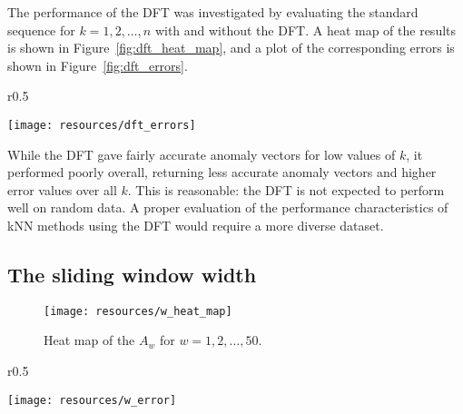 The performance of the DFT was investigated by evaluating the standard sequence for $k = 1,2,\dots, n$ with and without the DFT\@. A heat map of the results is shown in Figure~\ref{fig:dft_heat_map}, and a plot of the corresponding errors is shown in Figure~\ref{fig:dft_errors}.

\begin{wrapfigure}{r}{0.5\textwidth}
    \vspace{-30pt}
    \begin{center}
        \texttt{[image: resources/dft\_errors]}
    \end{center}
    \vspace{-20pt}
    \caption{\small{Errors of the $A_{k, t}$.}}
    \vspace{-10pt}
\label{fig:dft_errors}
\end{wrapfigure}

While the DFT gave fairly accurate anomaly vectors for low values of $k$, it performed poorly overall, returning less accurate anomaly vectors and higher error values over all $k$. This is reasonable: the DFT is not expected to perform well on random data. A proper evaluation of the performance characteristics of kNN methods using the DFT would require a more diverse dataset.

\clearpage

\subsection{The sliding window width}
\FloatBarrier{}
\label{sect:w}

\begin{figure}[h]
    \vspace{-15pt}
    \begin{center}
        \texttt{[image: resources/w\_heat\_map]}
    \end{center}
    \vspace{-20pt}
    \caption{\small{Heat map of the $A_w$ for $w = 1, 2, \dots, 50$.}}
    \vspace{-10pt}
\label{fig:w_heat_map}
\end{figure}

\begin{wrapfigure}{r}{0.5\textwidth}
    \vspace{-20pt}
    \begin{center}
        \texttt{[image: resources/w\_error]}
    \end{center}
    \vspace{-20pt}
    \caption{\small{Errors for the anomaly vectors $A_w$.}}
\label{fig:w_error}
    \vspace{-20pt}
\end{wrapfigure}

